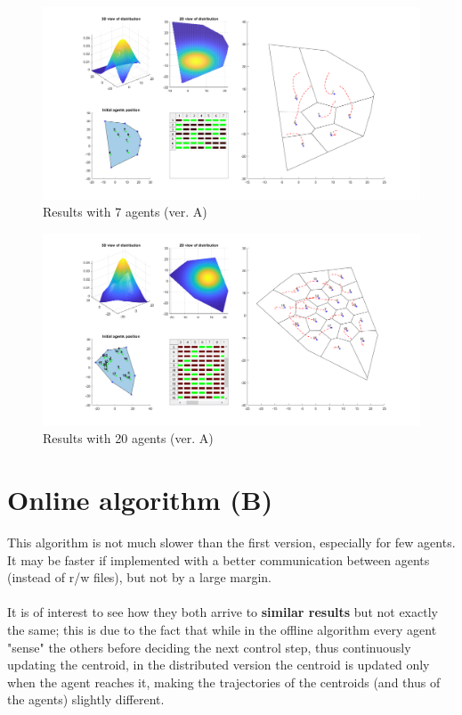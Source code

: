 \documentclass[a4paper,11pt,oneside]{book}
\begin{document}
	
	\begin{figure}	
		\centering	
		\includegraphics[scale=0.45,angle=90]{figs/convergenceResultsA.png}
		\caption{Results with 7 agents (ver. A)}\label{fig:convergenceResultsA.png}	
	\end{figure}
	
	\begin{figure}	
		\centering	
		\includegraphics[scale=0.45, angle=90]{figs/20convergenceResultsA.png}
		\caption{Results with 20 agents (ver. A)}\label{fig:20convergenceResultsA.png}	
	\end{figure}
	
	\section{Online algorithm (B)}
	This algorithm is not much slower than the first version, especially for few agents.\\
	It may be faster if implemented with a better communication between agents (instead of r/w files), but not by a large margin.\\\\
	It is of interest to see how they both arrive to \textbf{similar results} but not exactly the same; this is due to the fact that while in the offline algorithm every agent "sense" the others before deciding the next control step, thus continuously updating the centroid, in the distributed version the centroid is updated only when the agent reaches it, making the trajectories of the centroids (and thus of the agents) slightly different.
	
\end{document}
